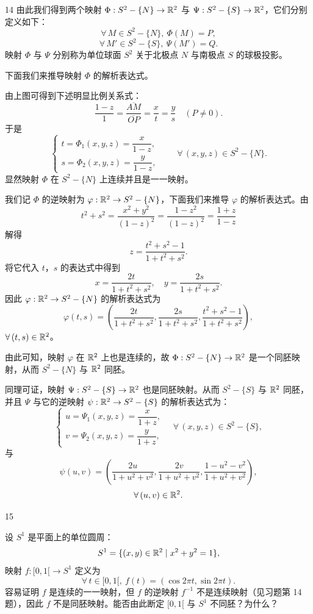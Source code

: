 \begin{sourceexample}{14}
由此我们得到两个映射 $\Phi:S^2-\{N\}\to\mathbb{R}^2$ 与 $\Psi:S^2-\{S\}\to\mathbb{R}^2$，它们分别定义如下：
\[\forall\,M\in S^2-\{N\},\ \Phi(M)=P,\]
\[\forall\,M'\in S^2-\{S\},\ \Psi(M')=Q.\]
映射 $\Phi$ 与 $\Psi$ 分别称为单位球面 $S^2$ 关于北极点 $N$ 与南极点 $S$ 的球极投影。

下面我们来推导映射 $\Phi$ 的解析表达式。

由上图可得到下述明显比例关系式：
\[\frac{1-z}{1}=\frac{\overline{AM}}{\overline{OP}}=\frac{x}{t}=\frac{y}{s}\quad(P\neq0).\]
于是
\[\begin{cases} t=\Phi_1(x,y,z)=\dfrac{x}{1-z},\\[1ex] s=\Phi_2(x,y,z)=\dfrac{y}{1-z}, \end{cases}\qquad\forall\,(x,y,z)\in S^2-\{N\}.\]
显然映射 $\Phi$ 在 $S^2-\{N\}$ 上连续并且是一一映射。

我们记 $\Phi$ 的逆映射为 $\varphi:\mathbb{R}^2\to S^2-\{N\}$，下面我们来推导 $\varphi$ 的解析表达式。由
\[t^2+s^2=\frac{x^2+y^2}{(1-z)^2}=\frac{1-z^2}{(1-z)^2}=\frac{1+z}{1-z}\]
解得
\[z=\frac{t^2+s^2-1}{1+t^2+s^2}.\]
将它代入 $t$，$s$ 的表达式中得到
\[x=\frac{2t}{1+t^2+s^2},\quad y=\frac{2s}{1+t^2+s^2}.\]
因此 $\varphi:\mathbb{R}^2\to S^2-\{N\}$ 的解析表达式为
\[\varphi(t,s)=\left(\frac{2t}{1+t^2+s^2},\frac{2s}{1+t^2+s^2},\frac{t^2+s^2-1}{1+t^2+s^2}\right),\]
$\forall\,(t,s)\in\mathbb{R}^2$。

由此可知，映射 $\varphi$ 在 $\mathbb{R}^2$ 上也是连续的，故 $\Phi:S^2-\{N\}\to\mathbb{R}^2$ 是一个同胚映射，从而 $S^2-\{N\}$ 与 $\mathbb{R}^2$ 同胚。

同理可证，映射 $\Psi:S^2-\{S\}\to\mathbb{R}^2$ 也是同胚映射。从而 $S^2-\{S\}$ 与 $\mathbb{R}^2$ 同胚，并且 $\Psi$ 与它的逆映射 $\psi:\mathbb{R}^2\to S^2-\{S\}$ 的解析表达式为：
\[\begin{cases} u=\Psi_1(x,y,z)=\dfrac{x}{1+z},\\[1ex] v=\Psi_2(x,y,z)=\dfrac{y}{1+z}, \end{cases}\quad\forall\,(x,y,z)\in S^2-\{S\},\]
与
\[\psi(u,v)=\left(\frac{2u}{1+u^2+v^2},\frac{2v}{1+u^2+v^2},\frac{1-u^2-v^2}{1+u^2+v^2}\right),\]
\[\forall\,(u,v)\in\mathbb{R}^2.\]

\end{sourceexample}

\begin{sourceexample}{15}

设 $S^1$ 是平面上的单位圆周：
\[S^1=\{(x,y)\in\mathbb{R}^2\mid x^2+y^2=1\},\]
映射 $f:[0,1[\to S^1$ 定义为
\[\forall\,t\in[0,1[,\ f(t)=(\cos2\pi t,\sin2\pi t).\]
容易证明 $f$ 是连续的一一映射，但 $f$ 的逆映射 $f^{-1}$ 不是连续映射（见习题第 14 题），因此 $f$ 不是同胚映射。能否由此断定 $[0,1[$ 与 $S^1$ 不同胚？为什么？

\end{sourceexample}

